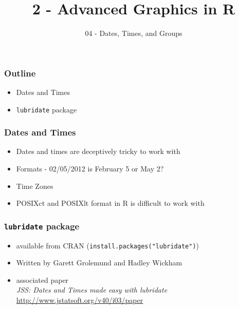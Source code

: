 \documentclass{beamer}\usepackage[]{graphicx}\usepackage[]{color}
\title[2-Graphics]{2 - Advanced Graphics in R}
\subtitle{04 - Dates, Times, and Groups}
\date{\hspace{1in}}
\institute[ISU]{Iowa State University}
\begin{document}
\begin{frame}
\maketitle
\end{frame}



\begin{frame}
\frametitle{Outline}
\begin{itemize}
\item Dates and Times
\item \texttt{lubridate} package
\end{itemize}
\end{frame}


\begin{frame}
\frametitle{Dates and Times}
\begin{itemize}
\item Dates and times are deceptively tricky to work with\medskip
\item Formats - 02/05/2012 is February 5 or May 2? \medskip
\item Time Zones\medskip
\item POSIXct and POSIXlt format in R is difficult to work with
\end{itemize}
\end{frame}

\begin{frame}
\frametitle{\texttt{lubridate} package}
\begin{itemize}
\item available from CRAN (\texttt{install.packages("lubridate")})\medskip
\item Written by Garett Grolemund and Hadley Wickham\medskip
\item associated paper\\\emph{JSS: Dates and Times made easy with lubridate}\\\url{http://www.jstatsoft.org/v40/i03/paper
}
\end{itemize}
\end{frame}
\end{document}

